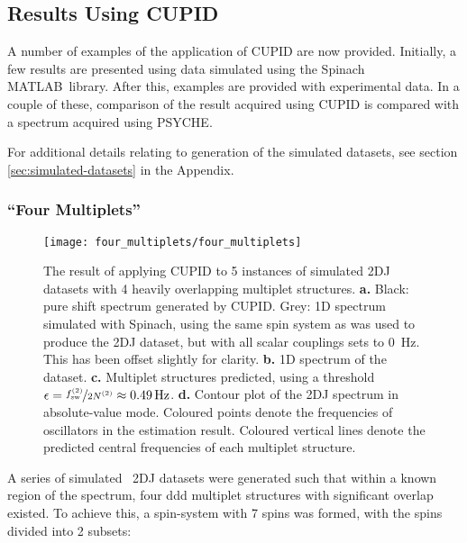 \subsection{Results Using \acs{CUPID}}
A number of examples of the application of \ac{CUPID} are now provided.
Initially, a few results are presented using data simulated using the Spinach
MATLAB\textregistered\ library\cite{Hogben2011}.
After this, examples are provided with experimental data. In a couple of these,
comparison of the result acquired using \ac{CUPID} is compared with a spectrum
acquired using \ac{PSYCHE}.

For additional details relating to generation of the simulated datasets, see
section \ref{sec:simulated-datasets} in the Appendix.

\subsubsection{``Four Multiplets''}
\begin{figure}
    \centering
    \texttt{[image: four\_multiplets/four\_multiplets]}
    \caption[
        The result of applying \acs{CUPID} to 5 instances of simulated
        \acs{2DJ} datasets with 4 heavily overlapping multiplet structures.
    ]{
        The result of applying \ac{CUPID} to 5 instances of simulated \ac{2DJ}
        datasets with 4 heavily overlapping multiplet structures.
        \textbf{a.} Black: pure shift spectrum generated by \ac{CUPID}.
        Grey: \ac{1D} spectrum simulated with Spinach, using the same spin
        system as was used to produce the \ac{2DJ} dataset, but with all scalar
        couplings sets to \qty{0}{\hertz}. This has been offset slightly for
        clarity.
        \textbf{b.} \ac{1D} spectrum of the dataset.
        \textbf{c.} Multiplet structures predicted, using a threshold $\epsilon
        = \nicefrac{f_{\mathrm{sw}}^{(2)}}{2 N^{(2)}} \approx \qty{0.49}{\hertz}$.
        \textbf{d.} Contour plot of the \ac{2DJ} spectrum in absolute-value
        mode. Coloured points denote the frequencies of oscillators in the
        estimation result.
        Coloured vertical lines denote the predicted central frequencies of
        each multiplet structure.
    }
    \label{fig:four-multiplets}
\end{figure}
A series of simulated \proton\ \ac{2DJ} datasets were generated such that
within a known region of the spectrum, four ddd multiplet structures with
significant overlap existed. To achieve this, a spin-system with 7 spins was
formed, with the spins divided into 2 subsets:
